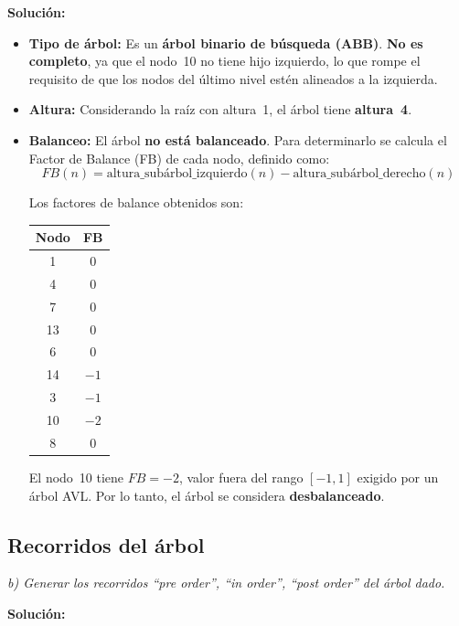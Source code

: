 \documentclass[12pt]{article}
\newcommand{\solucion}{%
    \vspace{0.8em}\textbf{Solución:}\par\vspace{0.4em}%
}
\begin{document}
\solucion

\begin{itemize}[leftmargin=2cm]
    \item \textbf{Tipo de árbol:} Es un \textbf{árbol binario de búsqueda (ABB)}.
    \textbf{No es completo}, ya que el nodo~10 no tiene hijo izquierdo,
    lo que rompe el requisito de que los nodos del último nivel estén
    alineados a la izquierda.

    \item \textbf{Altura:} Considerando la raíz con altura~1, el árbol
    tiene \textbf{altura~4}.

    \item \textbf{Balanceo:} El árbol \textbf{no está balanceado}.
    Para determinarlo se calcula el Factor de Balance (FB) de cada nodo,
    definido como:
    \[
        FB(n) = \text{altura\_subárbol\_izquierdo}(n) -
                \text{altura\_subárbol\_derecho}(n)
    \]

    \newpage
    Los factores de balance obtenidos son:
    \begin{center}
    \begin{tabular}{cc}
        \toprule
        \textbf{Nodo} & \textbf{FB} \\
        \midrule
        1  &  0 \\
        4  &  0 \\
        7  &  0 \\
        13 &  0 \\
        6  &  0 \\
        14 & $-1$ \\
        3  & $-1$ \\
        10 & $-2$ \\
        8  &  0 \\
        \bottomrule
    \end{tabular}
    \end{center}
    El nodo~10 tiene $FB = -2$, valor fuera del rango $[-1, 1]$
    exigido por un árbol AVL. Por lo tanto, el árbol se considera
    \textbf{desbalanceado}.
\end{itemize}

\subsection{Recorridos del árbol}

\textit{b) Generar los recorridos ``pre order'', ``in order'', ``post order'' del árbol dado.}

\solucion
\end{document}
